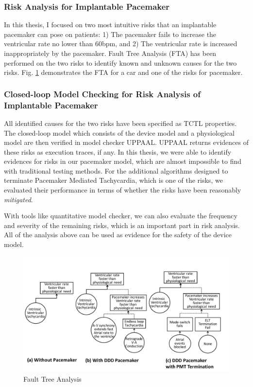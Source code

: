 \documentclass[a4paper]{article}
\begin{document}
\subsubsection{Risk Analysis for Implantable Pacemaker}
In this thesis, I focused on two most intuitive risks that an implantable pacemaker can pose on patients: 1) The pacemaker fails to increase the ventricular rate no lower than 60bpm, and 2) The ventricular rate is increased inappropriately by the pacemaker.
Fault Tree Analysis (FTA) has been performed on the two risks to identify known and unknown causes for the two risks. 
Fig. \ref{fig:FTA} demonstrates the FTA for a car and one of the risks for pacemaker.
\subsubsection{Closed-loop Model Checking for Risk Analysis of Implantable Pacemaker}
All identified causes for the two risks have been specified as TCTL properties.
The closed-loop model which consists of the device model and a physiological model are then verified in model checker UPPAAL.
UPPAAL returns evidences of these risks as execution traces, if any.
In this thesis, we were able to identify evidences for risks in our pacemaker model, which are almost impossible to find with traditional testing methods.
For the additional algorithms designed to terminate Pacemaker Mediated Tachycardia, which is one of the risks, we evaluated their performance in terms of whether the risks have been reasonably \emph{mitigated}.

With tools like quantitative model checker, we can also evaluate the frequency and severity of the remaining risks, which is an important part in risk analysis.
All of the analysis above can be used as evidence for the safety of the device model.
\begin{figure}[t]
	\centering
	\includegraphics[scale=0.35]{figs/FTA_new.pdf}
	\caption{\small Fault Tree Analysis}
	\label{fig:FTA}
\end{figure}
\end{document}
